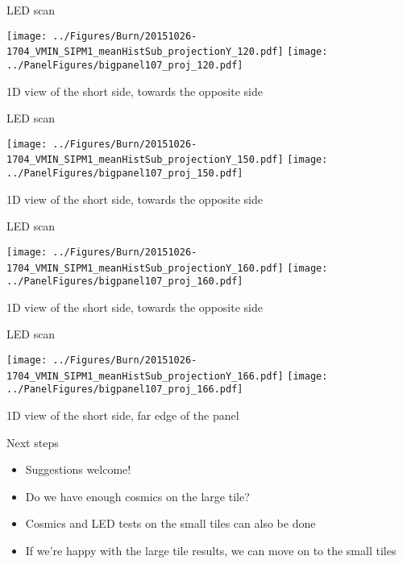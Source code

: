 \documentclass[compress,8pt]{beamer} %
\begin{document}
\begin{frame}{LED scan}
\begin{adjustwidth}{-3em}{-3em}
\begin{center}
\texttt{[image: ../Figures/Burn/20151026-1704\_VMIN\_SIPM1\_meanHistSub\_projectionY\_120.pdf]}
\texttt{[image: ../PanelFigures/bigpanel107\_proj\_120.pdf]}
\end{center}
\end{adjustwidth}
1D view of the short side, towards the opposite side
\end{frame}


\begin{frame}{LED scan}
\begin{adjustwidth}{-3em}{-3em}
\begin{center}
\texttt{[image: ../Figures/Burn/20151026-1704\_VMIN\_SIPM1\_meanHistSub\_projectionY\_150.pdf]}
\texttt{[image: ../PanelFigures/bigpanel107\_proj\_150.pdf]}
\end{center}
\end{adjustwidth}
1D view of the short side, towards the opposite side
\end{frame}


\begin{frame}{LED scan}
\begin{adjustwidth}{-3em}{-3em}
\begin{center}
\texttt{[image: ../Figures/Burn/20151026-1704\_VMIN\_SIPM1\_meanHistSub\_projectionY\_160.pdf]}
\texttt{[image: ../PanelFigures/bigpanel107\_proj\_160.pdf]}
\end{center}
\end{adjustwidth}
1D view of the short side, towards the opposite side
\end{frame}


\begin{frame}{LED scan}
\begin{adjustwidth}{-3em}{-3em}
\begin{center}
\texttt{[image: ../Figures/Burn/20151026-1704\_VMIN\_SIPM1\_meanHistSub\_projectionY\_166.pdf]}
\texttt{[image: ../PanelFigures/bigpanel107\_proj\_166.pdf]}
\end{center}
\end{adjustwidth}
1D view of the short side, far edge of the panel
\end{frame}


\begin{frame}{Next steps}
\begin{itemize}
\item Suggestions welcome!
\item Do we have enough cosmics on the large tile?
\item Cosmics and LED tests on the small tiles can also be done
\item If we're happy with the large tile results, we can move on to the small tiles
\end{itemize}
\end{frame}
\end{document}
